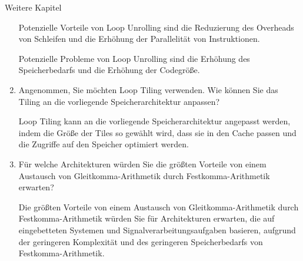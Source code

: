 \documentclass{article}
\begin{document}
\begin{exercise}{Weitere Kapitel}
\begin{enumerate}
          \begin{solution}
            Potenzielle Vorteile von Loop Unrolling sind die Reduzierung des Overheads von Schleifen und die Erhöhung der Parallelität von Instruktionen.

            Potenzielle Probleme von Loop Unrolling sind die Erhöhung des Speicherbedarfs und die Erhöhung der Codegröße.
          \end{solution}

    \item Angenommen, Sie möchten Loop Tiling verwenden. Wie können Sie das Tiling an die vorliegende Speicherarchitektur anpassen?

          \begin{solution}
            Loop Tiling kann an die vorliegende Speicherarchitektur angepasst werden, indem die Größe der Tiles so gewählt wird, dass sie in den Cache passen und die Zugriffe auf den Speicher optimiert werden.
          \end{solution}

    \item Für welche Architekturen würden Sie die größten Vorteile von einem Austausch von Gleitkomma-Arithmetik durch Festkomma-Arithmetik erwarten?

          \begin{solution}
            Die größten Vorteile von einem Austausch von Gleitkomma-Arithmetik durch Festkomma-Arithmetik würden Sie für Architekturen erwarten, die auf eingebetteten Systemen und Signalverarbeitungsaufgaben basieren, aufgrund der geringeren Komplexität und des geringeren Speicherbedarfs von Festkomma-Arithmetik.
          \end{solution}
  \end{enumerate}
\end{exercise}
\end{document}
